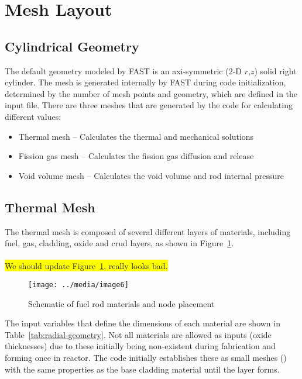 \section{Mesh Layout} \label{section:mesh-layout}
\subsection{Cylindrical Geometry} \label{section:cylindrical_geometry}

The default geometry modeled by FAST is an axi-symmetric (2-D $r$,$z$) solid
right cylinder. The mesh is generated internally by FAST during code
initialization, determined by the number of mesh points and geometry, which are
defined in the input file. There are three meshes that are generated by the
code for calculating different values:
\begin{itemize}

    \item Thermal mesh -- Calculates the thermal and mechanical solutions

    \item Fission gas mesh -- Calculates the fission gas diffusion and release

    \item Void volume mesh -- Calculates the void volume and rod internal pressure

\end{itemize}

\subsection{Thermal Mesh}\label{section:thermal-mesh}

The thermal mesh is composed of several different layers of materials, including fuel, gas,
cladding, oxide and crud layers, as shown in Figure~\ref{fig:mat-node-placement}.
\\
\\
\colorbox{yellow}{We should update Figure~\ref{fig:mat-node-placement}, really looks bad.}
\begin{figure}
    \texttt{[image: ../media/image6]}
    \caption{Schematic of fuel rod materials and node placement}
    \label{fig:mat-node-placement}
\end{figure}

The input variables that define the dimensions of each material are shown in
Table~\ref{tab:radial-geometry}. Not all materials are allowed as inputs (oxide thicknesses) due to
these initially being non-existent during fabrication and forming once in reactor. The code
initially establishes these as small meshes () with the same properties as the base
cladding material until the layer forms.

